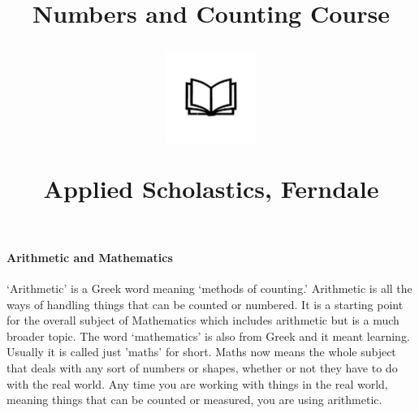 \documentclass[12pt]{article}
\title{Numbers and Counting Course\\
\begin{center}
\includegraphics[width=4em]{ApS_logo.png}
\end{center}
\begin{normalsize}Applied Scholastics, Ferndale \end{normalsize}}
\author{}
\date{}
\begin{document}
\maketitle

\paragraph{Arithmetic and Mathematics}
‘Arithmetic’ is a Greek word meaning ‘methods of counting.’ Arithmetic is all the ways of handling things that can be counted or numbered. It is a starting point for the overall subject of Mathematics which includes arithmetic but is a much broader topic. The word ‘mathematics’ is also from Greek and it meant learning. Usually it is called just 'maths' for short. Maths now means the whole subject that deals with any sort of numbers or shapes, whether or not they have to do with the real world. Any time you are working with things in the real world, meaning things that can be counted or measured, you are using arithmetic.
\end{document}

